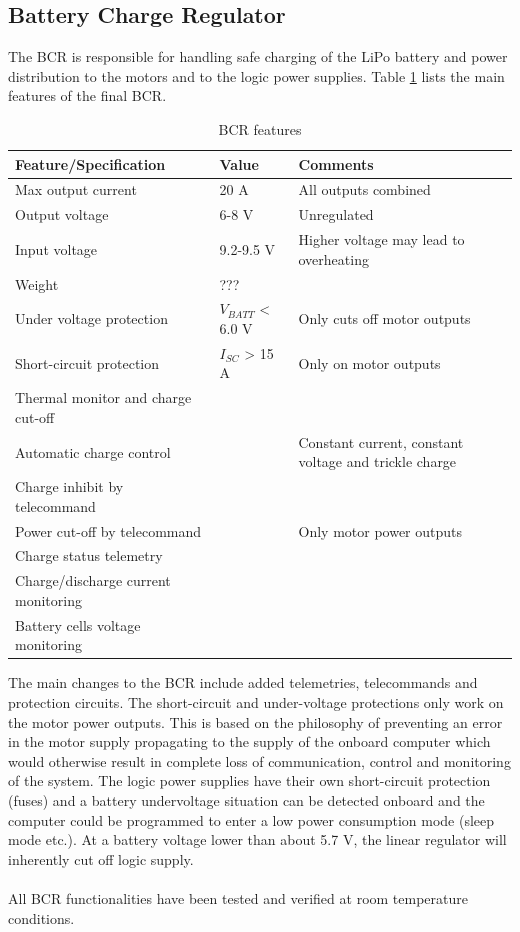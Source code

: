 \subsection{Battery Charge Regulator}
%
The \ac{BCR} is responsible for handling safe charging of the \ac{LiPo} battery and power distribution to the motors and to the logic power supplies. Table \ref{tab:BCR_features} lists the main features of the final \ac{BCR}.
%
\begin{table}[H]
\centering
\caption{\ac{BCR} features}
\label{tab:BCR_features}
\begin{tabular}{p{}p{}p{}}
\hline
\textbf{Feature/Specification} & \textbf{Value} & \textbf{Comments}\\
\hline
Max output current & 20 A & All outputs combined \\
Output voltage & 6-8 V & Unregulated \\
Input voltage & 9.2-9.5 V & Higher voltage may lead to overheating\\
Weight & ??? & \\
Under voltage protection & $V_{BATT}$ < 6.0 V & Only cuts off motor outputs \\
Short-circuit protection & $I_{SC}$ > 15 A & Only on motor outputs \\
Thermal monitor and charge cut-off & & \\
Automatic charge control &  & Constant current, constant voltage and trickle charge\\
Charge inhibit by telecommand & & \\
Power cut-off by telecommand & & Only motor power outputs\\
Charge status telemetry & &\\
Charge/discharge current monitoring & & \\
Battery cells voltage monitoring & & \\
\hline
\end{tabular}
\end{table} 
%
\noindent
The main changes to the \ac{BCR} include added telemetries, telecommands and protection circuits. The short-circuit and under-voltage protections only work on the motor power outputs. This is based on the philosophy of preventing an error in the motor supply propagating to the supply of the onboard computer which would otherwise result in complete loss of communication, control and monitoring of the system. The logic power supplies have their own short-circuit protection (fuses) and a battery undervoltage situation can be detected onboard and the computer could be programmed to enter a low power consumption mode (sleep mode etc.). At a battery voltage lower than about 5.7 V, the linear regulator will inherently cut off logic supply.\\\\
%
All \ac{BCR} functionalities have been tested and verified at room temperature conditions.
%
%
